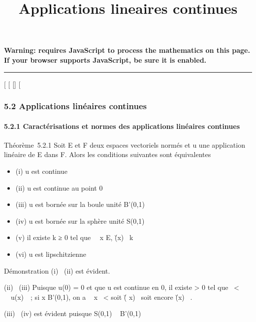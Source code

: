 \documentclass[]{article}
\title{Applications lineaires continues}
\author{}
\date{}
\begin{document}
\maketitle

\textbf{Warning: 
requires JavaScript to process the mathematics on this page.\\ If your
browser supports JavaScript, be sure it is enabled.}

\begin{center}\rule{3in}{0.4pt}\end{center}

{[}
{[}
{[}{]}
{[}

\subsubsection{5.2 Applications linéaires continues}

\paragraph{5.2.1 Caractérisations et normes des applications linéaires
continues}

Théorème~5.2.1 Soit E et F deux espaces vectoriels normés et u une
application linéaire de E dans F. Alors les conditions suivantes sont
équivalentes

\begin{itemize}
\itemsep1pt\parskip0pt
\item
  (i) u est continue
\item
  (ii) u est continue au point 0
\item
  (iii) u est bornée sur la boule unité B'(0,1)
\item
  (iv) u est bornée sur la sphère unité S(0,1)
\item
  (v) il existe k ≥ 0 tel que \forall~~x \in E,
  \u(x)\ \leq
  k\x\
\item
  (vi) u est lipschitzienne
\end{itemize}

Démonstration (i) \rigtharrow~(ii) est évident.

(ii) \rigtharrow~(iii) Puisque u(0) = 0 et que u est continue en 0, il existe \eta
\textgreater{} 0 tel que
\x\ \textless{} \eta
\rigtharrow~\ u(x)\ ~; si x \in
B'(0,1), on a \ \eta {}
x\ \leq \eta {} \textless{} \eta
soit \u( \eta \over 2
x)\  soit encore
\u(x)\ 
\over \eta .

(iii) \rigtharrow~(iv) est évident puisque S(0,1) \subset~ B'(0,1)
\end{document}
